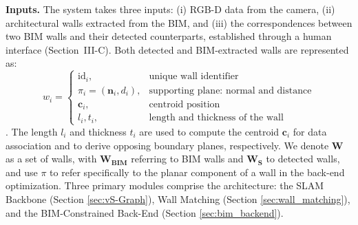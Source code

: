 \textbf{Inputs.} The system takes three inputs: (i) RGB-D data from the camera, (ii) architectural walls extracted from the BIM, and 
(iii) the correspondences between two BIM walls and their detected counterparts, established through a human interface (Section~III-C).
Both detected and BIM-extracted walls are represented as:
% 
\begin{equation}
w_i = 
\begin{cases}
\mathrm{id}_i, & \text{unique wall identifier} \\
\pi_i = (\mathbf{n}_i, d_i), & \text{supporting plane: normal and distance} \\
\mathbf{c}_i, & \text{centroid position} \\
l_i, t_i, & \text{length and thickness of the wall}
\end{cases}
\end{equation}
.
{The length $l_i$ and thickness $t_i$ are used to compute the centroid $\mathbf{c}_i$ for data association and to derive opposing boundary planes, respectively.}
We denote $\mathbf{W}$ as a set of walls, with $\mathbf{W_{\text{BIM}}}$ referring to BIM walls and $\mathbf{W_S}$ to detected walls, and use $\pi$ to refer specifically to the planar component of a wall in the back-end optimization.
Three primary modules comprise the architecture: the SLAM Backbone (Section \ref{sec:vS-Graph}), Wall Matching (Section \ref{sec:wall_matching}), and the BIM-Constrained Back-End (Section \ref{sec:bim_backend}).



